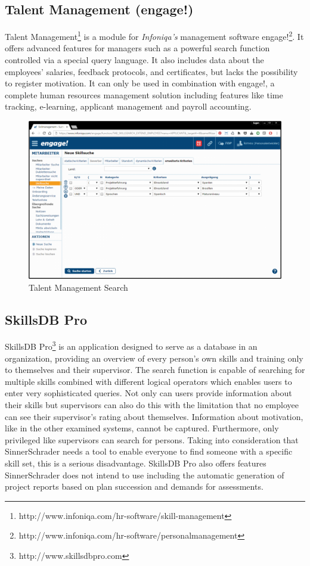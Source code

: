 \subsection{Talent Management (engage!)}
Talent Management\footnote{http://www.infoniqa.com/hr-software/skill-management} is a module for \textit{Infoniqa’s} management software engage!\footnote{http://www.infoniqa.com/hr-software/personalmanagement}. It offers advanced features for managers such as a powerful search function controlled via a special query language. It also includes data about the employees’ salaries, feedback protocols, and certificates, but lacks the possibility to register motivation. It can only be used in combination with engage!, a complete human resources management solution including features like time tracking, e-learning, applicant management and payroll accounting.

\begin{figure}[!htp]
    \centering
    \includegraphics[width=\textwidth]{images/talent_management_-_skillmanagement_-_skillsuche.png}
    \caption[Screenshot: Talent Management Search]{Talent Management Search}
    \label{fig:talent_management}
\end{figure}

\subsection{SkillsDB Pro}
SkillsDB Pro\footnote{http://www.skillsdbpro.com} is an application designed to serve as a database in an organization, providing an overview of every person’s own skills and training only to themselves and their supervisor. The search function is capable of searching for multiple skills combined with different logical operators which enables users to enter very sophisticated queries.
Not only can users provide information about their skills but supervisors can also do this with the limitation that no employee can see their supervisor's rating about themselves. Information about motivation, like in the other examined systems, cannot be captured.
Furthermore, only privileged like supervisors can search for persons. Taking into consideration that SinnerSchrader needs a tool to enable everyone to find someone with a specific skill set, this is a serious disadvantage.
SkillsDB Pro also offers features SinnerSchrader does not intend to use including the automatic generation of project reports based on plan succession and demands for assessments.

